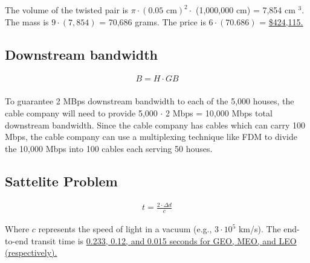 The volume of the twisted pair is $\pi \cdot (0.05 \text{ cm})^2 \cdot $ (1,000,000 cm) = 7,854 cm $^3$. The mass is $9 \cdot (7,854)$ = 70,686 grams. The price is $6 \cdot (70.686)$ = \ul{\$424,115.}


\subsection{Downstream bandwidth}
\begin{align*}
	B = H \cdot GB \\
\end{align*}

To guarantee 2 MBps downstream bandwidth to each of the 5,000 houses, the cable company will need to provide 5,000 $\cdot$ 2 Mbps = 10,000 Mbps total downstream bandwidth. Since the cable company has cables which can carry 100 Mbps, the cable company can use a multiplexing technique like FDM to divide the 10,000 Mbps into 100 cables each serving 50 houses.

\subsection{Sattelite Problem}
\begin{align*}
	t = \frac{2 \cdot \Delta d}{c}
\end{align*}

Where $c$ represents the speed of light in a vacuum (e.g., $3 \cdot 10^5$ km/s). The end-to-end transit time is \ul{0.233, 0.12, and 0.015 seconds for GEO, MEO, and LEO (respectively).}




